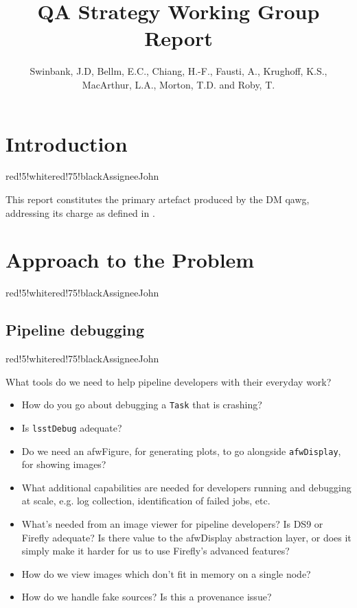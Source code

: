 \documentclass[DM,authoryear,toc,lsstdraft]{lsstdoc}
\title{QA Strategy Working Group Report}
\author{%
Swinbank, J.D,
Bellm, E.C.,
Chiang, H.-F.,
Fausti, A.,
Krughoff, K.S.,
MacArthur, L.A.,
Morton, T.D. and
Roby, T.
}
\date{\vcsDate}
\begin{document}
\newcommand{\assign}[1]{
  \begin{admonition}{red!5!white}{red!75!black}{Assignee}{}#1\end{admonition}
}

\maketitle

\section{Introduction}
\label{sec:intro}

\assign{John}

This report constitutes the primary artefact produced by the DM \gls{qawg},
addressing its charge as defined in .

\section{Approach to the Problem}

\assign{John}

\subsection{Pipeline debugging}

\assign{John}

What tools do we need to help pipeline developers with their everyday work?

\begin{itemize}

  \item{How do you go about debugging a \texttt{Task} that is crashing?}
  \item{Is \texttt{lsstDebug} adequate?}
  \item{Do we need an afwFigure, for generating plots, to go alongside \texttt{afwDisplay}, for showing images?}
  \item{What additional capabilities are needed for developers running and debugging at scale, e.g. log collection, identification of failed jobs, etc.}
  \item{What's needed from an image viewer for pipeline developers? Is DS9 or Firefly adequate? Is there value to the afwDisplay abstraction layer, or does it simply make it harder for us to use Firefly's advanced features?}
  \item{How do we view images which don't fit in memory on a single node?}
  \item{How do we handle fake sources? Is this a provenance issue?}

\end{itemize}
\end{document}
